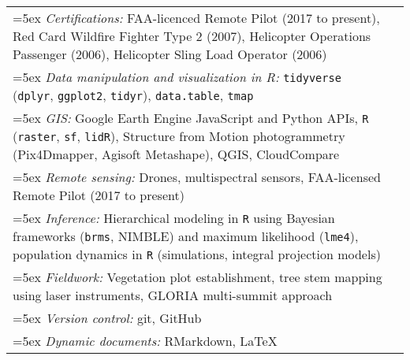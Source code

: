 \begin{longtable}{@{}>{\raggedright}p{6.25in} >{\raggedleft}X@{}}

\hangindent=5ex \emph{Certifications:} FAA-licenced Remote Pilot (2017 to present), Red Card Wildfire Fighter Type 2 (2007), Helicopter Operations Passenger (2006), Helicopter Sling Load Operator (2006) & \tabularnewline
\hangindent=5ex \emph{Data manipulation and visualization in R:} \texttt{tidyverse} (\texttt{dplyr}, \texttt{ggplot2}, \texttt{tidyr}), \texttt{data.table}, \texttt{tmap} & \tabularnewline
\hangindent=5ex \emph{GIS:} Google Earth Engine JavaScript and Python APIs, \texttt{R} (\texttt{raster}, \texttt{sf}, \texttt{lidR}), Structure from Motion photogrammetry (Pix4Dmapper, Agisoft Metashape), QGIS, CloudCompare & \tabularnewline
\hangindent=5ex \emph{Remote sensing:} Drones, multispectral sensors, FAA-licensed Remote Pilot (2017 to present) & \tabularnewline
\hangindent=5ex \emph{Inference:} Hierarchical modeling in \texttt{R} using Bayesian frameworks (\texttt{brms}, NIMBLE) and maximum likelihood (\texttt{lme4}), population dynamics in \texttt{R} (simulations, integral projection models) & \tabularnewline
\hangindent=5ex \emph{Fieldwork:} Vegetation plot establishment, tree stem mapping using laser instruments, GLORIA multi-summit approach & \tabularnewline
\hangindent=5ex \emph{Version control:} git, GitHub & \tabularnewline
\hangindent=5ex \emph{Dynamic documents:} RMarkdown, \LaTeX{} & \tabularnewline

\end{longtable}